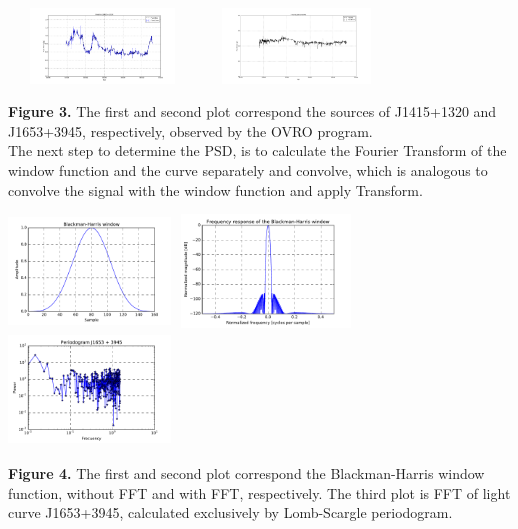 \documentclass[a0paper,portrait]{baposter}
\begin{document}
\begin{poster}
{\begin{center}
\includegraphics [height=20mm, width=50mm] {curvaJ1415.jpg}
\hspace{.5cm}
\includegraphics [height=20mm, width=50mm] {curvaJ1653.jpg}
\end{center}
\small{\textbf{Figure 3.} The first and second plot correspond the sources of J1415+1320 and J1653+3945, respectively, observed by the OVRO program.}\\
The next step to determine the PSD, is to calculate the Fourier Transform of the window function and the curve separately and convolve, which is analogous to convolve the signal with the window function and apply Transform.
\begin{center}
\includegraphics [height=30mm, width=43mm] {BH.pdf}
\hspace{.3cm}
\includegraphics [height=30mm, width=48mm] {FFTBH.pdf}
\hspace{.3cm}
\includegraphics [height=30mm, width=43mm] {FFTcurva_2.pdf}
\end{center}
\small{\textbf{Figure 4.} The first and second plot correspond the  Blackman-Harris window function, without FFT and with FFT, respectively. The third plot is FFT of light curve J1653+3945, calculated exclusively by Lomb-Scargle periodogram.}
}


\end{poster}
\end{document}
